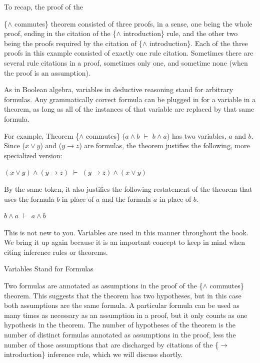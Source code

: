 To recap, the proof of the {\{$\wedge$ commutes\} theorem
consisted of three proofs, in a sense,
one being the whole proof, ending in the citation of
the \{$\wedge$ introduction\} rule,
and the other two being the proofs required by the citation of \{$\wedge$ introduction\}.
Each of the three proofs in this example consisted of exactly one rule citation.
Sometimes there are several rule citations in a proof, sometimes only one,
and sometime none (when the proof is an assumption).

\begin{aside}
As in Boolean algebra, variables in deductive reasoning
stand for arbitrary formulas.
Any grammatically correct formula
can be plugged in for a variable in a theorem,
as long as all of the instances of that variable are
replaced by that same formula.

For example,
Theorem \{$\wedge$ commutes\} ($a \wedge b$ $\vdash$ $b \wedge a$)
has two variables, $a$ and $b$.
Since ($x \vee y$) and ($y \rightarrow z$) are formulas,
the theorem justifies the following, more specialized
version:
\begin{center}
$(x \vee y) \wedge (y \rightarrow z)$ $\vdash$ $(y \rightarrow z) \wedge (x \vee y)$
\end{center}
By the same token, it also justifies the following restatement of the
theorem that uses the formula $b$ in place of $a$ and the formula $a$ in place of $b$.
\begin{center}
$b \wedge a$ $\vdash$ $a \wedge b$
\end{center}

This is not new to you.
Variables are used in this manner throughout the book.
We bring it up again because it is an important
concept to keep in mind when citing inference rules
or theorems.

\caption{Variables Stand for Formulas}
\label{variable-stand-for-formulas}
\end{aside}

Two formulas are annotated as assumptions in the
proof of the \{$\wedge$ commutes\} theorem.
This suggests that the theorem has
two hypotheses,
but in this case both assumptions are the same formula.
A particular formula can be used as many times as necessary as
an assumption in a proof, but it only counts as one hypothesis
in the theorem.
The number of hypotheses
of the theorem is the number of distinct
formulas annotated as assumptions in the proof,
less the number of those assumptions that are discharged
by citations of the \{$\rightarrow$ introduction\} inference rule,
which we will discuss shortly.

}
